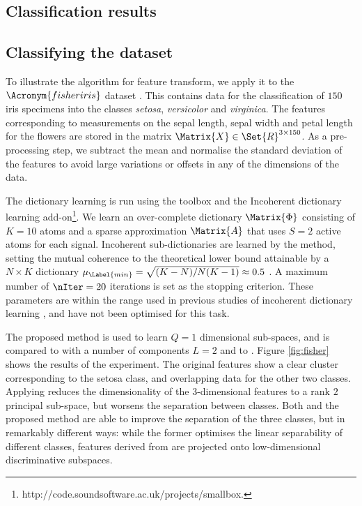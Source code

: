 \documentclass{article}
\def \nComponents{L} 	%
\def \Feas{\Matrix{X}} 	%
\def \nDim{N} 			%
\def \Dic{\Matrix{\Phi}} %
\def \nAto{K} 			%
\def \Coeff{\Matrix{A}} 	%
\def \nActiveAtoms{S} 	%
\def \ambient{\Set{R}} 						%
\def \nDimSub{Q}
\begin{document}
\subsection{Classification results}
\begin{figure}
\centering
{}
\caption{}
\end{figure}

\subsection{Classifying the  dataset}\label{sec:fisher}
To illustrate the  algorithm for feature transform, we apply it to the $\Acronym{fisheriris}$ dataset \cite{Fisher1936Th}. This contains data for the classification of $150$ iris specimens into the classes \emph{setosa}, \emph{versicolor} and \emph{virginica}. The features corresponding to measurements on the sepal length, sepal width and petal length for the flowers are stored in the matrix $\Feas\in\ambient^{3\times 150}$.  As a pre-processing step, we subtract the mean and normalise the standard deviation of the features to avoid large variations or offsets in any of the dimensions of the data.

The dictionary learning is run using the  toolbox and the Incoherent dictionary learning add-on\footnote{http://code.soundsoftware.ac.uk/projects/smallbox.}. We learn an over-complete dictionary $\Dic$ consisting of $\nAto=10$ atoms and a sparse approximation $\Coeff$ that uses $\nActiveAtoms=2$ active atoms for each signal. Incoherent sub-dictionaries are learned by the  method, setting the mutual coherence to the theoretical lower bound attainable by a $\nDim\times \nAto$ dictionary $\mu_{\Label{min}} = \sqrt{(\nAto-\nDim)/\nDim(\nAto-1)}\approx 0.5$ \cite{Strohmer2003Gr}. A maximum number of $\nIter=20$ iterations is set as the stopping criterion. These parameters are within the range used in previous studies of incoherent dictionary learning \cite{Barchiesi2013Le}, and have not been optimised for this task.

The proposed method is used to learn $\nDimSub=1$ dimensional sub-spaces, and is  compared to  with a number of components $\nComponents=2$ and to . Figure \ref{fig:fisher} shows the results of the experiment. The original features show a clear cluster corresponding to the setosa class, and overlapping data for the other two classes. Applying  reduces the dimensionality of the $3$-dimensional features to a rank $2$ principal sub-space, but worsens the separation between classes. Both  and the proposed method are able to improve the separation of the three classes, but in remarkably different ways: while the former optimises the linear separability of different classes, features derived from  are projected onto low-dimensional discriminative subspaces.
\end{document}
